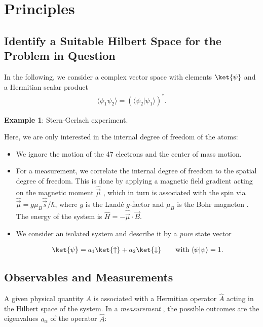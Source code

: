 \section{Principles}

\subsection{Identify a Suitable Hilbert Space for the Problem in Question}

In the following, we consider a complex vector space with elements $\ket{\psi}$ and a Hermitian scalar product
\begin{align}
				\langle\psi_1 \psi_2\rangle=(\langle{\psi_2}| \psi_1\rangle)^*.
\end{align}

\textbf{Example 1}: Stern-Gerlach experiment.

Here, we are only interested in the internal degree of freedom of the atoms:

\begin{itemize}
						\item 	We ignore the motion of the 47 electrons and the center of mass motion.
						\item 	For a measurement, we correlate the internal degree of freedom to the spatial degree of freedom. This is done by applying a magnetic field gradient acting on the magnetic moment $\hat{\vec{\mu}}$ , which in turn is associated with the spin via $\hat{\vec{\mu}} = g \mu_B \hat{\vec{s}}/\hbar$, where $g$ is the Landé $g$-factor  and $\mu_B$ is the Bohr magneton . The energy of the system is $\hat{H} = -\hat{\vec{\mu}} \cdot \vec{B}$.
						\item 	We consider an isolated system and describe it by a \emph{pure} state vector

\begin{align}
	\ket{\psi} = a_1 \ket{\uparrow} + a_2 \ket{\downarrow}  \qquad \text{with} \; \langle\psi | \psi\rangle = 1.
\end{align}
					
\end{itemize}

\subsection{Observables and Measurements}
			A given physical quantity $A$ is associated with a Hermitian operator $\hat{A}$  acting in the Hilbert space  of the system.
						In a \emph{measurement} , the possible outcomes are the eigenvalues $a_\alpha$  of the operator $\hat{A}$:

